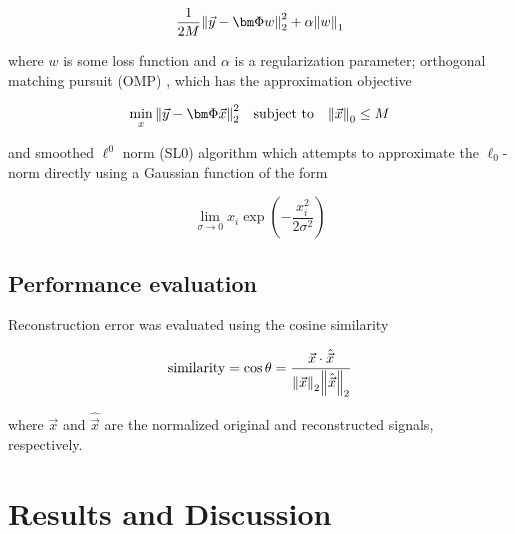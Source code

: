\documentclass[10pt,a4paper,twoside]{article}
\begin{document}
\begin{equation}\label{eq:lasso}
	\frac{1}{2M} \norm{\vec{y} - \bm\Phi w}_2^2 + \alpha \norm{w}_1
\end{equation}

where $w$ is some loss function and $\alpha$ is a regularization parameter; orthogonal matching pursuit (OMP) \cite{sklearn}, which has the approximation objective

\begin{equation}\label{eq:omp}
	\min_x \norm{\vec{y} - \bm\Phi\vec{x}}_2^2 \quad \textrm{subject to} \quad \norm{\vec{x}}_0 \leq M
\end{equation}

and smoothed $\ell^0$ norm (SL0) algorithm \cite{sl0} which attempts to approximate the $\ell_0$-norm directly using a Gaussian function of the form

\begin{equation}\label{eq:sl0-kernel}
	\lim_{\sigma \rightarrow 0} x_i \exp(-\frac{x_i^2}{2\sigma^2})
\end{equation}

\subsection{Performance evaluation}
\label{ssec:eval}
Reconstruction error was evaluated using the cosine similarity

\begin{equation}\label{eq:cossim}
	\textrm{similarity} = \cos{\theta} = \frac{\vec{x} \cdot \hat{\vec{x}}}{\norm{\vec{x}}_2 \norm{\hat{\vec{x}}}_2}
\end{equation}

where $\vec{x}$ and $\hat{\vec{x}}$ are the normalized original and reconstructed signals, respectively.

\section{Results and Discussion}\label{sec:RnD}
\end{document}
